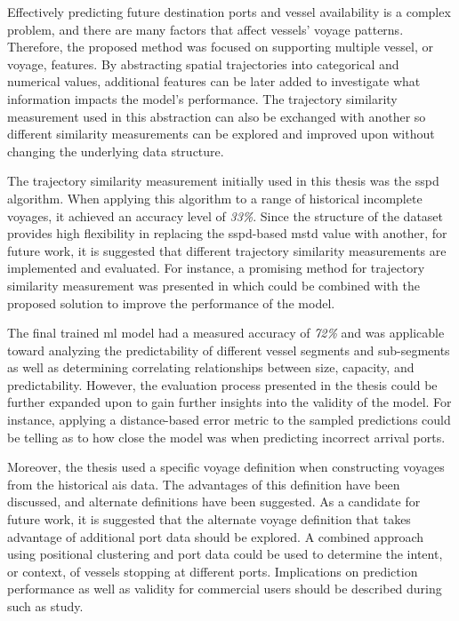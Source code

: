 Effectively predicting future destination ports and vessel availability is a complex problem, and there are many factors that affect vessels' voyage patterns. Therefore, the proposed method was focused on supporting multiple vessel, or voyage, features. By abstracting spatial trajectories into categorical and numerical values, additional features can be later added to investigate what information impacts the model's performance. The trajectory similarity measurement used in this abstraction can also be exchanged with another so different similarity measurements can be explored and improved upon without changing the underlying data structure.

The trajectory similarity measurement initially used in this thesis was the \acrfull{sspd} algorithm. When applying this algorithm to a range of historical incomplete voyages, it achieved an accuracy level of \textit{33\%}. Since the structure of the dataset provides high flexibility in replacing the \acrshort{sspd}-based \acrshort{mstd} value with another, for future work, it is suggested that different trajectory similarity measurements are implemented and evaluated. For instance, a promising method for trajectory similarity measurement was presented in \cite{Zhang2020AISApproach} which could be combined with the proposed solution to improve the performance of the model.

The final trained \acrfull{ml} model had a measured accuracy of \textit{72\%} and was applicable toward analyzing the predictability of different vessel segments and sub-segments as well as determining correlating relationships between size, capacity, and predictability. However, the evaluation process presented in the thesis could be further expanded upon to gain further insights into the validity of the model. For instance, applying a distance-based error metric to the sampled predictions could be telling as to how close the model was when predicting incorrect arrival ports.

Moreover, the thesis used a specific voyage definition when constructing voyages from the historical \acrshort{ais} data. The advantages of this definition have been discussed, and alternate definitions have been suggested. As a candidate for future work, it is suggested that the alternate voyage definition that takes advantage of additional port data should be explored. A combined approach using positional clustering and port data could be used to determine the intent, or context, of vessels stopping at different ports. Implications on prediction performance as well as validity for commercial users should be described during such as study.

